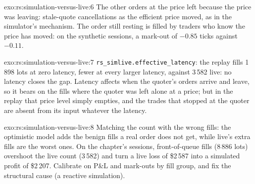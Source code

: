 \begin{solution}{exo:rs:simulation-versus-live:6}
The other orders at the price left because the price was leaving: stale-quote cancellations as the efficient price moved, as in the simulator's mechanism. The order
still resting is filled by traders who know the price has moved: on the synthetic sessions, a mark-out of $-0.85$ ticks against $-0.11$.
\end{solution}

\begin{solution}{exo:rs:simulation-versus-live:7}
\texttt{rs\_simlive.effective\_latency}: the replay fills 1\,898 lots at zero latency, fewer at every larger latency, against 3\,582 live: no latency closes the gap.
Latency affects when the quoter's orders arrive and leave, so it bears on the fills where the quoter was left alone at a price; but in the replay that price level simply
empties, and the trades that stopped at the quoter are absent from its input whatever the latency.
\end{solution}

\begin{solution}{exo:rs:simulation-versus-live:8}
Matching the count with the wrong fills: the optimistic model adds the benign fills a real order does not get, while live's extra fills are the worst ones. On the chapter's
sessions, front-of-queue fills (8\,886 lots) overshoot the live count (3\,582) and turn a live loss of \$2\,587 into a simulated profit of \$2\,207. Calibrate on P\&L and
mark-outs by fill group, and fix the structural cause (a reactive simulation).
\end{solution}

